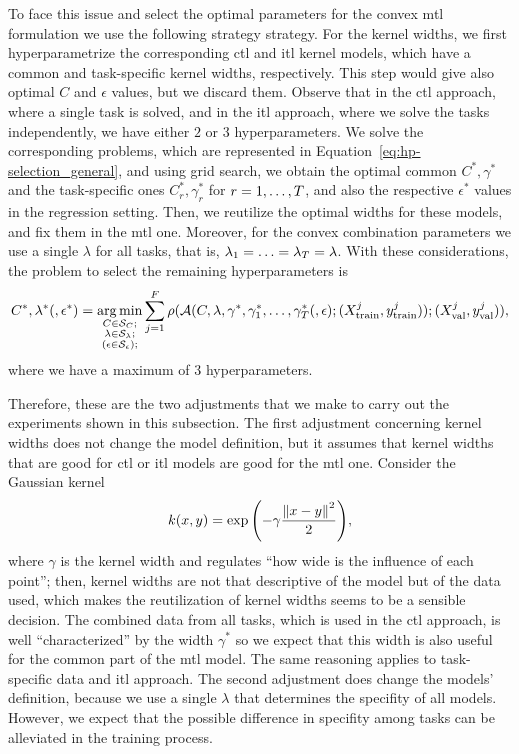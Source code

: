To face this issue and select the optimal parameters for the convex \acrshort{mtl} formulation we use the following strategy strategy.
%
For the kernel widths, we first hyperparametrize the corresponding \acrshort{ctl} and \acrshort{itl} kernel models, which have a common and task-specific kernel widths, respectively. 
This step would give also optimal $C$ and $\epsilon$ values, but we discard them.
Observe that in the \acrshort{ctl} approach, where a single task is solved, and in the \acrshort{itl} approach, where we solve the tasks independently, we have either $2$ or $3$ hyperparameters. We solve the corresponding problems, which are represented in Equation~\eqref{eq:hp-selection_general}, and using grid search, we obtain the optimal common $C^*, \gamma^*$ and the task-specific ones $C_r^*, \gamma^*_r$ for $r=1, \ldots, T$, and also the respective $\epsilon^*$ values in the regression setting.
Then, we reutilize the optimal widths for these models, and fix them in the \acrshort{mtl} one. 
%
Moreover, for the convex combination parameters we use a single $\lambda$ for all tasks, that is, $\lambda_1 = \ldots = \lambda_T = \lambda$.
%
With these considerations, the problem to select the remaining hyperparameters is 
\begin{equation}
    \nonumber
    C^*, \lambda^* (, \epsilon^*) = \operatorname*{arg\min}_{\substack{C \in \mathcal{S}_C ; \\ \substack{\lambda \in \mathcal{S}_\lambda} ; \\ \left(\substack{\epsilon \in \mathcal{S}_\epsilon} \right); }}
     \sum_{j=1}^{F} \rho(\mathcal{A}(C, \lambda, \gamma^*, \gamma_1^*, \ldots, \gamma_T^* (, \epsilon); (X^j_\text{train}, y^j_\text{train})); (X^j_\text{val}, y^j_\text{val})) ,
\end{equation}
where we have a maximum of $3$ hyperparameters.

%
Therefore, these are the two adjustments that we make to carry out the experiments shown in this subsection.
The first adjustment concerning kernel widths does not change the model definition, but it assumes that kernel widths that are good for \acrshort{ctl} or \acrshort{itl} models are good for the \acrshort{mtl} one. 
Consider the Gaussian kernel
\begin{equation}
    \nonumber
    k(x, y) = \exp{\left(-\gamma \frac{\left\lVert x - y\right\rVert^2}{2} \right)},
\end{equation}
where $\gamma$ is the kernel width and regulates ``how wide is the influence of each point'';
then, kernel widths are not that descriptive of the model but of the data used, which makes the reutilization of kernel widths seems to be a sensible decision.
The combined data from all tasks, which is used in the \acrshort{ctl} approach, is well ``characterized'' by the width $\gamma^*$ so we expect that this width is also useful for the common part of the \acrshort{mtl} model. The same reasoning applies to task-specific data and \acrshort{itl} approach.
%
The second adjustment does change the models' definition, because we use a single $\lambda$ that determines the specifity of all models. However, we expect that the possible difference in specifity among tasks can be alleviated in the training process.

